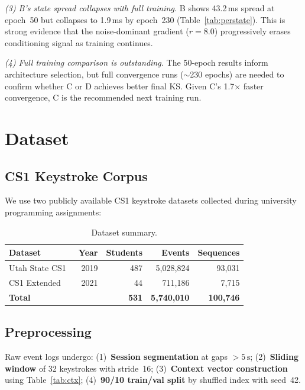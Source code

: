 \documentclass[sigconf,nonacm]{acmart}
\begin{document}
\textit{(3) B's state spread collapses with full training.}
B shows 43.2\,ms spread at epoch~50 but collapses to 1.9\,ms by epoch~230
(Table~\ref{tab:perstate}).
This is strong evidence that the noise-dominant gradient ($r\!=\!8.0$)
progressively erases conditioning signal as training continues.

\textit{(4) Full training comparison is outstanding.}
The 50-epoch results inform architecture selection, but full convergence
runs ($\sim$230 epochs) are needed to confirm whether C or D achieves
better final KS. Given C's 1.7× faster convergence, C is the recommended
next training run.


\section{Dataset}

\subsection{CS1 Keystroke Corpus}

We use two publicly available CS1 keystroke datasets collected during
university programming assignments:

\begin{table}[t]
\centering
\caption{Dataset summary.}
\begin{tabular}{lrrrr}
\toprule
Dataset & Year & Students & Events & Sequences \\
\midrule
Utah State CS1~\cite{leinonen2019cs1} & 2019 & 487 & 5,028,824 & 93,031 \\
CS1 Extended~\cite{pirkola2021cs1}    & 2021 & 44  &   711,186 &  7,715 \\
\midrule
\textbf{Total} & & \textbf{531} & \textbf{5,740,010} & \textbf{100,746} \\
\bottomrule
\end{tabular}
\label{tab:dataset}
\end{table}

\subsection{Preprocessing}

Raw event logs undergo:
(1)~\textbf{Session segmentation} at gaps $> 5\,\text{s}$;
(2)~\textbf{Sliding window} of 32 keystrokes with stride~16;
(3)~\textbf{Context vector construction} using Table~\ref{tab:ctx};
(4)~\textbf{90/10 train/val split} by shuffled index with seed~42.
\end{document}
